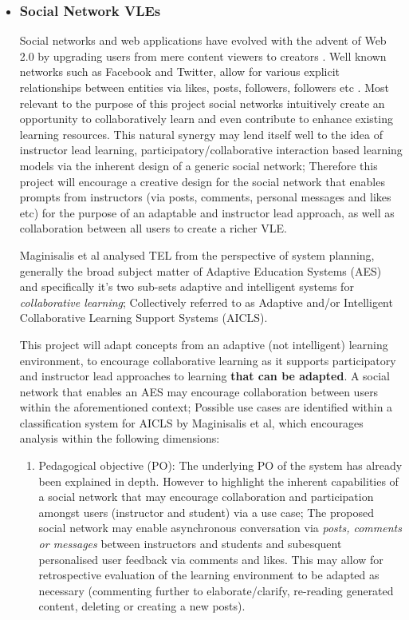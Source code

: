     \begin{itemize}[\null]
    \item \subsubsection{Social Network VLEs}
    
    Social networks and web applications have evolved with the advent of Web 2.0 by upgrading users from mere content viewers to creators \cite{Lopez-Vargas2015}. Well known networks such as Facebook and Twitter, allow for various explicit relationships between entities via likes, posts, followers, followers etc \cite{Lopez-Vargas2015}. Most relevant to the purpose of this project social networks intuitively create an opportunity to collaboratively learn and even contribute to enhance existing learning resources\cite{Lopez-Vargas2015,Magnisalis2011}. This natural synergy may lend itself well to the idea of instructor lead learning, participatory/collaborative interaction based learning models via the inherent design of a generic social network; Therefore this project will encourage a creative design for the social network that enables prompts from instructors (via posts, comments, personal messages and likes etc) for the purpose of an adaptable and instructor lead approach, as well as collaboration between all users to create a richer VLE.
    
    Maginisalis et al \cite{Magnisalis2011} analysed TEL from the perspective of system planning, generally the broad subject matter of  Adaptive Education Systems (AES) and specifically it's two sub-sets adaptive and intelligent systems   for \textit{collaborative learning}; Collectively referred to as Adaptive and/or Intelligent Collaborative Learning Support Systems (AICLS).
    
    This project will adapt concepts from an adaptive (not intelligent) learning environment, to encourage collaborative learning as it supports participatory and instructor lead approaches to learning \textbf{that can be adapted}.  A social network that enables an AES may encourage  collaboration between users within the aforementioned context; Possible use cases are identified within a classification system for AICLS  by Maginisalis et al, which encourages analysis within the following dimensions\cite{Magnisalis2011}:
    
    \begin{enumerate}
        \item Pedagogical objective (PO): The underlying PO of the system has already been explained in depth. However to highlight the inherent capabilities of a social network that may encourage collaboration and participation amongst users (instructor and student) via a use case; The proposed social network may enable  asynchronous conversation via \textit{posts, comments or messages} between instructors and students and subesquent  personalised user feedback via comments and likes. This may  allow for retrospective evaluation of the learning environment to be adapted as necessary (commenting further to elaborate/clarify, re-reading generated content, deleting or creating a new posts).
        

\end{enumerate}
\end{itemize}
